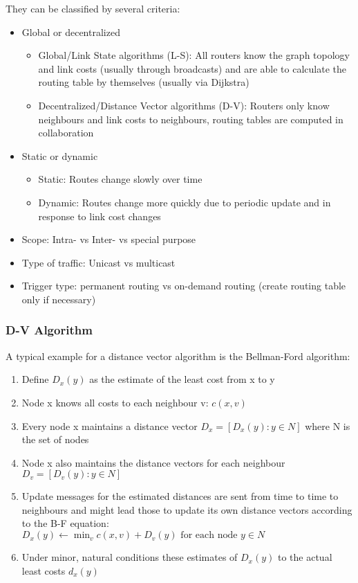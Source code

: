 They can be classified by several criteria:
\begin{itemize}
  \item Global or decentralized
  \begin{itemize}
    \item Global/Link State algorithms (L-S): All routers know the graph topology and link costs (usually through broadcasts) and are able to calculate the routing table by themselves (usually via Dijkstra)
    \item Decentralized/Distance Vector algorithms (D-V): Routers only know neighbours and link costs to neighbours, routing tables are computed in collaboration
  \end{itemize}
  \item Static or dynamic
  \begin{itemize}
    \item Static: Routes change slowly over time
    \item Dynamic: Routes change more quickly due to periodic update and in response to link cost changes
  \end{itemize}
  \item Scope: Intra- vs Inter- vs special purpose
  \item Type of traffic: Unicast vs multicast
  \item Trigger type: permanent routing vs on-demand routing (create routing table only if necessary)
\end{itemize}

\subsubsection*{D-V Algorithm}
A typical example for a distance vector algorithm is the Bellman-Ford algorithm:
\begin{enumerate}
  \item Define $D_x(y)$ as the estimate of the least cost from x to y
  \item Node x knows all costs to each neighbour v: $c(x,v)$
  \item Every node x maintains a distance vector $D_x = [D_x(y): y \in N]$ where N is the set of nodes
  \item Node x also maintains the distance vectors for each neighbour $D_v = [D_v(y): y \in N]$
  \item Update messages for the estimated distances are sent from time to time to neighbours and might lead those to update its own distance vectors according to the B-F equation:
    $D_x(y) \leftarrow \min_v{c(x,v) + D_v(y)} \text{ for each node } y \in N$
  \item Under minor, natural conditions these estimates of $D_x(y)$ to the actual least costs $d_x(y)$
\end{enumerate}

